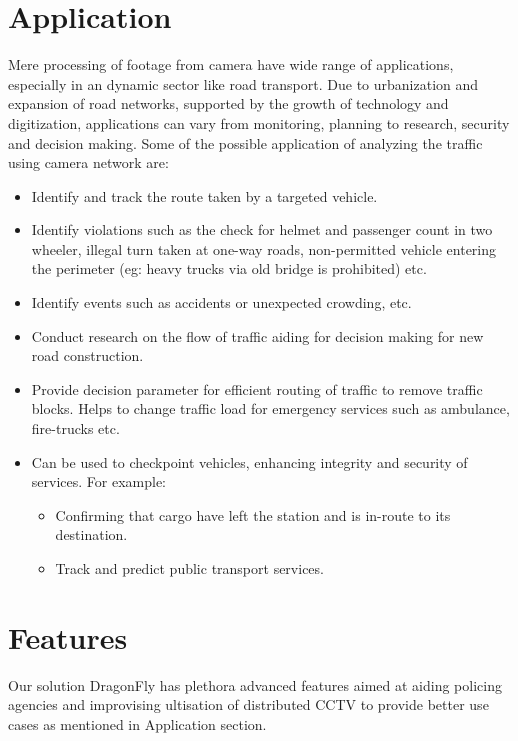 \section{Application}
Mere processing of footage from camera have wide range of applications, especially in an dynamic sector like road transport. Due to urbanization and expansion of road networks, supported by the growth of technology and digitization, applications can vary from monitoring, planning to research, security and decision making. Some of the possible application of analyzing the traffic using camera network are:
\begin{itemize}
	\item Identify and track the route taken by a targeted vehicle.
	\item Identify violations such as the check for helmet and passenger count in two wheeler, illegal turn taken at one-way roads, non-permitted vehicle entering the perimeter (eg: heavy trucks via old bridge is prohibited) etc.
	\item Identify events such as accidents or unexpected crowding, etc.
	\item Conduct research on the flow of traffic aiding for decision making for new road construction.
	\item Provide decision parameter for efficient routing of traffic to remove traffic blocks. Helps to change traffic load for emergency services such as ambulance, fire-trucks etc.
	\item Can be used to checkpoint vehicles, enhancing integrity and security of services. For example:
	\begin{itemize}
		\item Confirming that cargo have left the station and is in-route to its destination.
		\item Track and predict public transport services.
	\end{itemize}
\end{itemize}


\section{Features}
Our solution DragonFly has plethora advanced features aimed at aiding policing agencies and improvising ultisation of distributed CCTV to provide better use cases as mentioned in Application section.


